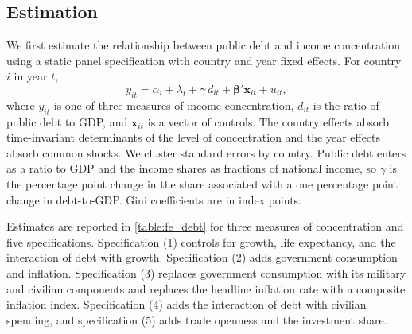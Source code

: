 \documentclass[12pt, titlepage]{article}
\numberwithin{equation}{section}
\begin{document}
\subsection{Estimation}
\label{section:baseline}

We first estimate the relationship between public debt and income concentration
using a static panel specification with country and year fixed effects. For
country $i$ in year $t$,
\begin{equation}
	y_{it} = \alpha_{i} + \lambda_{t} + \gamma \, d_{it}
	+ \boldsymbol{\beta}' \mathbf{x}_{it} + u_{it},
	\label{eq:fe}
\end{equation}
where $y_{it}$ is one of three measures of income concentration, $d_{it}$ is the
ratio of public debt to GDP, and $\mathbf{x}_{it}$ is a vector of controls. The
country effects absorb time-invariant determinants of the level of
concentration and the year effects absorb common shocks. We cluster standard
errors by country. Public debt enters as a ratio to GDP and the income shares as
fractions of national income, so $\gamma$ is the percentage point change in the
share associated with a one percentage point change in debt-to-GDP. Gini
coefficients are in index points.

Estimates are reported in \autoref{table:fe_debt} for three measures of
concentration and five specifications. Specification (1) controls for growth,
life expectancy, and the interaction of debt with growth. Specification (2) adds
government consumption and inflation. Specification (3) replaces government
consumption with its military and civilian components and replaces the
headline inflation rate with a composite inflation index. Specification (4)
adds the interaction of debt with civilian spending, and specification (5) adds
trade openness and the investment share.
\end{document}
